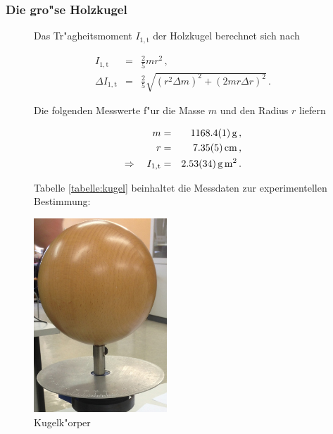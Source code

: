 			\subsubsection{Die gro"se Holzkugel}
			\label{subsubsec:holzkugel}
				\begin{figure}[htbp]
					
					\begin{minipage}[t]{8cm}
						\vspace{0pt}
						Das Tr"agheitsmoment $I_\mathrm{1, t}$ der Holzkugel berechnet sich nach

						\begin{eqnarray*}
							I_\mathrm{1, t} & = & \frac{2}{5}mr^2 \,, \\
							\Delta I_\mathrm{1, t} & = & \frac{2}{5} \sqrt{ \left(r^2 \Delta m\right)^2 + \left( 2 mr \Delta r\right)^2} \,.
						\end{eqnarray*}

						Die folgenden Messwerte f"ur die Masse $m$ und den Radius $r$ liefern

						\begin{eqnarray*}
							m & = & \SI{1168.4 (1)}{\gram} \,, \\
							r & = & \SI{7.35 (5)}{\centi \meter} \,, \\
							\Rightarrow \quad I_\mathrm{1, t} & = & \SI{2.53 (34)}{\gram \meter \squared} \,.
						\end{eqnarray*}

						Tabelle \ref{tabelle:kugel} beinhaltet die Messdaten zur experimentellen Bestimmung:
					\end{minipage}
					\hfill
					\begin{minipage}[t]{5cm}
						\vspace{0pt}
						\centering
						\includegraphics[width = 5cm]{img/kugel.jpg}
						\caption{Kugelk"orper}
						\label{fig:kugel}
					\end{minipage}
				\end{figure}

